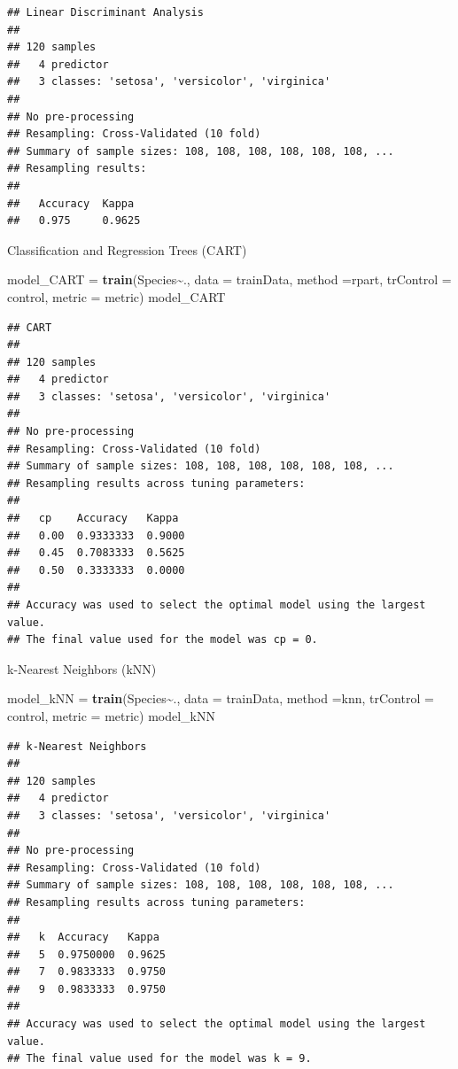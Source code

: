 \documentclass[
]{article}
\newenvironment{Shaded}{\begin{snugshade}}{\end{snugshade}}
\newcommand{\AttributeTok}[1]{\textcolor[rgb]{0.13,0.29,0.53}{#1}}
\newcommand{\FunctionTok}[1]{\textcolor[rgb]{0.13,0.29,0.53}{\textbf{#1}}}
\newcommand{\NormalTok}[1]{#1}
\newcommand{\OtherTok}[1]{\textcolor[rgb]{0.56,0.35,0.01}{#1}}
\newcommand{\SpecialCharTok}[1]{\textcolor[rgb]{0.81,0.36,0.00}{\textbf{#1}}}
\newcommand{\StringTok}[1]{\textcolor[rgb]{0.31,0.60,0.02}{#1}}
\begin{document}
\begin{verbatim}
## Linear Discriminant Analysis 
## 
## 120 samples
##   4 predictor
##   3 classes: 'setosa', 'versicolor', 'virginica' 
## 
## No pre-processing
## Resampling: Cross-Validated (10 fold) 
## Summary of sample sizes: 108, 108, 108, 108, 108, 108, ... 
## Resampling results:
## 
##   Accuracy  Kappa 
##   0.975     0.9625
\end{verbatim}

Classification and Regression Trees (CART)

\begin{Shaded}
\begin{Highlighting}[]
\NormalTok{model\_CART }\OtherTok{=} \FunctionTok{train}\NormalTok{(Species}\SpecialCharTok{\textasciitilde{}}\NormalTok{., }\AttributeTok{data =}\NormalTok{ trainData, }\AttributeTok{method =}\StringTok{\textquotesingle{}rpart\textquotesingle{}}\NormalTok{, }\AttributeTok{trControl =}\NormalTok{ control, }\AttributeTok{metric =}\NormalTok{ metric)}
\NormalTok{model\_CART}
\end{Highlighting}
\end{Shaded}

\begin{verbatim}
## CART 
## 
## 120 samples
##   4 predictor
##   3 classes: 'setosa', 'versicolor', 'virginica' 
## 
## No pre-processing
## Resampling: Cross-Validated (10 fold) 
## Summary of sample sizes: 108, 108, 108, 108, 108, 108, ... 
## Resampling results across tuning parameters:
## 
##   cp    Accuracy   Kappa 
##   0.00  0.9333333  0.9000
##   0.45  0.7083333  0.5625
##   0.50  0.3333333  0.0000
## 
## Accuracy was used to select the optimal model using the largest value.
## The final value used for the model was cp = 0.
\end{verbatim}

k-Nearest Neighbors (kNN)

\begin{Shaded}
\begin{Highlighting}[]
\NormalTok{model\_kNN }\OtherTok{=} \FunctionTok{train}\NormalTok{(Species}\SpecialCharTok{\textasciitilde{}}\NormalTok{., }\AttributeTok{data =}\NormalTok{ trainData, }\AttributeTok{method =}\StringTok{\textquotesingle{}knn\textquotesingle{}}\NormalTok{, }\AttributeTok{trControl =}\NormalTok{ control, }\AttributeTok{metric =}\NormalTok{ metric)}
\NormalTok{model\_kNN}
\end{Highlighting}
\end{Shaded}

\begin{verbatim}
## k-Nearest Neighbors 
## 
## 120 samples
##   4 predictor
##   3 classes: 'setosa', 'versicolor', 'virginica' 
## 
## No pre-processing
## Resampling: Cross-Validated (10 fold) 
## Summary of sample sizes: 108, 108, 108, 108, 108, 108, ... 
## Resampling results across tuning parameters:
## 
##   k  Accuracy   Kappa 
##   5  0.9750000  0.9625
##   7  0.9833333  0.9750
##   9  0.9833333  0.9750
## 
## Accuracy was used to select the optimal model using the largest value.
## The final value used for the model was k = 9.
\end{verbatim}
\end{document}

